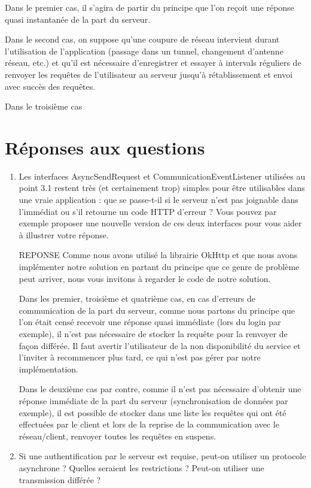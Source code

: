 \documentclass[a4paper]{article}
\begin{document}
Dans le premier cas, il s'agira de partir du principe que l'on reçoit une réponse quasi instantanée de la part du serveur.

Dans le second cas, on suppose qu'une coupure de réseau intervient durant l'utilisation de l'application (passage dans un tunnel, changement d'antenne réseau, etc.) et qu'il est nécessaire d'enregistrer et essayer à intervals réguliers de renvoyer les requêtes de l'utilisateur au serveur jusqu'à rétablissement et envoi avec succès des requêtes.

Dans le troisième cas 

\section{Réponses aux questions}

\begin{enumerate}
	\item Les interfaces AsyncSendRequest et CommunicationEventListener utilisées au point 3.1 restent très (et certainement trop) simples pour être utilisables dans une vraie application : que se passe-t-il si le serveur n’est pas joignable dans l’immédiat ou s’il retourne un code HTTP d’erreur ? Vous pouvez par exemple proposer une nouvelle version de ces deux interfaces pour vous aider à illustrer votre réponse.
    
    REPONSE
    Comme nous avons utilisé la librairie OkHttp et que nous avons implémenter notre solution en partant du principe que ce genre de problème peut arriver, nous vous invitons à regarder le code de notre solution.
    
    Dans les premier, troisième et quatrième cas, en cas d'erreurs de communication de la part du serveur, comme nous partons du principe que l'on était censé recevoir une réponse quasi immédiate (lors du login par exemple), il n'est pas nécessaire de stocker la requête pour la renvoyer de façon différée. Il faut avertir l'utilisateur de la non disponibilité du service et l'inviter à recommencer plus tard, ce qui n'est pas gérer par notre implémentation.
    
    Dans le deuxième cas par contre, comme il n'est pas nécessaire d'obtenir une réponse immédiate de la part du serveur (synchronisation de données par exemple), il est possible de stocker dans une liste les requêtes qui ont été effectuées par le client et lors de la reprise de la communication avec le réseau/client, renvoyer toutes les requêtes en suspens.
	
    \item Si une authentification par le serveur est requise, peut-on utiliser un protocole asynchrone ? Quelles seraient les restrictions ? Peut-on utiliser une transmission différée ?
    

\end{enumerate}
\end{document}
